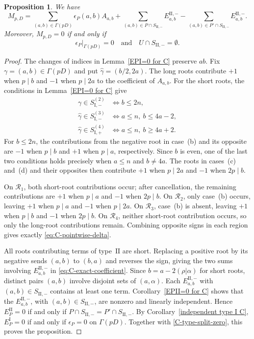 \documentclass[11pt,a4paper]{amsart}
\theoremstyle{plain}
\newtheorem{prop}[theorem]{Proposition}
\numberwithin{equation}{section}
\newenvironment{pf}{\begin{proof}}{\end{proof}}
\begin{document}
\begin{prop}\label{C_cr}
We have
\begin{equation}\label{eq:C-exact-coefficient}
M_{p,D}
={}\sum_{(a,b)\in\Gamma(pD)}\epsilon_P(a,b)A_{a,b}+\sum_{(a,b)\in P\cap S_{\mathrm{II},-}}
 E_{a,b}^{\mathrm{II},-}
-\sum_{(a,b)\in P'\cap S_{\mathrm{II},-}}
 E_{a,b}^{\mathrm{II},-}.
\end{equation}
Moreover, \(M_{p,D}=0\) if and only if
\[
\epsilon_P|_{\Gamma(pD)}=0
\quad\text{and}\quad
U\cap S_{\mathrm{II},-}=\emptyset.
\]
\end{prop}
\begin{pf}
The changes of indices in Lemma~\ref{EPI=0 for C} preserve \(ab\).
Fix \(\gamma=(a,b)\in\Gamma(pD)\) and put
\(\widehat\gamma=(b/2,2a)\).
The long roots contribute \(+1\) when \(p\mid b\) and \(-1\)
when \(p\mid2a\) to the coefficient of \(A_{a,b}\).
For the short roots, the conditions in
Lemma~\ref{EPI=0 for C} give
\[
\begin{aligned}
\gamma\in S_{\mathrm{I},-}^{(2)}
&\Longleftrightarrow b\le2n,\\
\widehat\gamma\in S_{\mathrm{I},-}^{(3)}
&\Longleftrightarrow a\le n,\ b\le4a-2,\\
\widehat\gamma\in S_{\mathrm{I},+}^{(4)}
&\Longleftrightarrow a\le n,\ b\ge4a+2.
\end{aligned}
\]
For \(b\le2n\), the contributions from the negative root in
case~(b) and its opposite are \(-1\) when \(p\mid b\) and \(+1\)
when \(p\mid a\), respectively. Since \(b\) is even, one of the
last two conditions holds precisely when \(a\le n\) and \(b\ne4a\).
The roots in cases~(c) and~(d) and their opposites then contribute
\(+1\) when \(p\mid2a\) and \(-1\) when \(2p\mid b\).

On \(\mathcal R_1\), both short-root contributions occur; after
cancellation, the remaining contributions are \(+1\) when
\(p\mid a\) and \(-1\) when \(2p\mid b\).
On \(\mathcal R_2\), only case~(b) occurs, leaving \(+1\) when
\(p\mid a\) and \(-1\) when \(p\mid2a\).
On \(\mathcal R_3\), case~(b) is absent, leaving \(+1\) when
\(p\mid b\) and \(-1\) when \(2p\mid b\).
On \(\mathcal R_4\), neither short-root contribution occurs, so
only the long-root contributions remain. Combining opposite signs
in each region gives exactly \eqref{eq:C-pointwise-delta}.

All roots contributing terms of type~\(\mathrm{II}\) are short.
Replacing a positive root by its negative sends \((a,b)\) to
\((b,a)\) and reverses the sign, giving the two sums involving
\(E_{a,b}^{\mathrm{II},-}\) in \eqref{eq:C-exact-coefficient}.
Since \(b=a-2(\rho|\alpha)\) for short roots,
distinct pairs \((a,b)\) involve disjoint sets of \((a,\alpha)\).
Each \(E_{a,b}^{\mathrm{II},-}\) with
\((a,b)\in S_{\mathrm{II},-}\) contains at least one term.
Corollary~\ref{EPII=0 for C} shows that the
\(E_{a,b}^{\mathrm{II},-}\), with
\((a,b)\in S_{\mathrm{II},-}\), are nonzero and linearly independent.
Hence \(E_P^{\mathrm{II}}=0\) if and
only if \(P\cap S_{\mathrm{II},-}=P'\cap S_{\mathrm{II},-}\).
By Corollary~\ref{independent type I C},
\(E_P^{\mathrm I}=0\) if and only if \(\epsilon_P=0\)
on \(\Gamma(pD)\).
Together with \eqref{C-type-split-zero}, this proves the proposition.
\end{pf}
\end{document}
